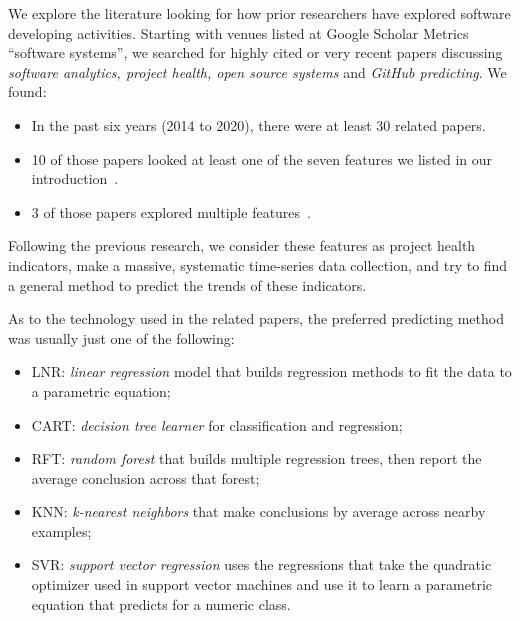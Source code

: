 \documentclass[smallextended]{svjour3}
\newcommand{\bi}{\begin{itemize}}
\newcommand{\ei}{\end{itemize}}
\newcommand{\BLACK}{\color{black}}
\begin{document}
We explore the literature looking for how prior researchers have explored software developing activities. 
Starting with venues listed at Google Scholar Metrics 
``software systems'', 
we searched for highly cited or very recent papers discussing 
{\em software analytics, project health, open  source systems} and {\em GitHub predicting}.
We found:
\BLACK
\bi
\item In the past six years (2014 to 2020), there were at least 30 related papers.
\item 10 of those papers looked at least one of the seven features we listed in our introduction~\cite{liao2019healthy,borges2016predicting,jarczyk2018surgical,kikas2016using,qi2017software,aggarwal2014co,chen2014predicting,han2019characterization,weber2014makes,bidoki2018cross}.
\item 3 of those papers explored multiple features~\cite{liao2019healthy,jarczyk2018surgical,bidoki2018cross}.
\ei

Following the previous research, we consider these features as project health indicators, make a massive, systematic time-series data collection, and try to find a general method to predict the trends of these indicators.

As to the technology used in the related papers, the preferred predicting method was usually just one of the following:
\BLACK

\bi
\item  LNR: {\em linear regression} model that builds regression methods to fit the data to a parametric equation; 
\item CART: {\em decision tree learner} for classification and regression;
\item RFT:  {\em random forest}   that builds multiple regression trees, then report the average conclusion across that forest;
\item KNN:  {\em k-nearest neighbors} that make conclusions by average across nearby examples;
\item SVR:   {\em support vector regression} uses the regressions that take the quadratic optimizer used in support vector machines and use it to learn a parametric equation that predicts for a numeric class. 
\ei
\end{document}
